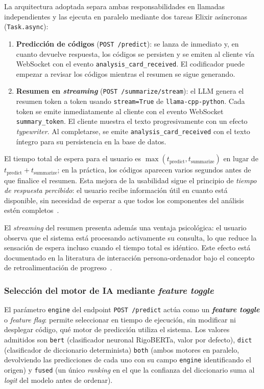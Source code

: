 La arquitectura adoptada separa ambas responsabilidades en llamadas independientes y las ejecuta en paralelo mediante dos tareas Elixir asíncronas (\texttt{Task.async}):

\begin{enumerate}
 \item \textbf{Predicción de códigos} (\texttt{POST /predict}): se lanza de inmediato y, en cuanto devuelve respuesta, los códigos se persisten y se emiten al cliente vía WebSocket con el evento \texttt{analysis\_card\_received}. El codificador puede empezar a revisar los códigos mientras el resumen se sigue generando.

 \item \textbf{Resumen en \emph{streaming}} (\texttt{POST /summarize/stream}): el LLM genera el resumen token a token usando \texttt{stream=True} de \texttt{llama-cpp-python}. Cada token se emite inmediatamente al cliente con el evento WebSocket \texttt{summary\_token}. El cliente muestra el texto progresivamente con un efecto \emph{typewriter}. Al completarse, se emite \texttt{analysis\_card\_received} con el texto íntegro para su persistencia en la base de datos.
\end{enumerate}

El tiempo total de espera para el usuario es $\max(t_{\text{predict}}, t_{\text{summarize}})$ en lugar de $t_{\text{predict}} + t_{\text{summarize}}$; en la práctica, los códigos aparecen varios segundos antes de que finalice el resumen. Esta mejora de la usabilidad sigue el principio de \emph{tiempo de respuesta percibido}: el usuario recibe información útil en cuanto está disponible, sin necesidad de esperar a que todos los componentes del análisis estén completos~\cite{Nielsen94}.

El \emph{streaming} del resumen presenta además una ventaja psicológica: el usuario observa que el sistema está procesando activamente su consulta, lo que reduce la sensación de espera incluso cuando el tiempo total es idéntico. Este efecto está documentado en la literatura de interacción persona-ordenador bajo el concepto de retroalimentación de progreso~\cite{Harrison07}.

\subsubsection{Selección del motor de IA mediante \emph{feature toggle}}
\label{sec:feature-toggle}

El parámetro \texttt{engine} del endpoint \texttt{POST /predict} actúa como un \textbf{\emph{feature toggle}} o \emph{feature flag}: permite seleccionar en tiempo de ejecución, sin modificar ni desplegar código, qué motor de predicción utiliza el sistema. Los valores admitidos son \texttt{\textquotedbl{}bert\textquotedbl{}} (clasificador neuronal RigoBERTa, valor por defecto), \texttt{\textquotedbl{}dict\textquotedbl{}} (clasificador de diccionario determinista) \texttt{\textquotedbl{}both\textquotedbl{}} (ambos motores en paralelo, devolviendo las predicciones de cada uno con su campo \texttt{\textquotedbl{}engine\textquotedbl{}} identificando el origen) y \texttt{\textquotedbl{}fused\textquotedbl{}} (un único \emph{ranking} en el que la confianza del diccionario suma al \emph{logit} del modelo antes de ordenar).

